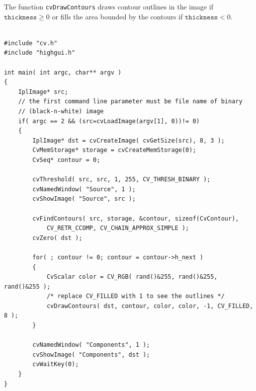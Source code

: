 \begin{description}
\end{description}

The function \texttt{cvDrawContours} draws contour outlines in the image if $\texttt{thickness} \ge 0$ or fills the area bounded by the contours if $ \texttt{thickness}<0$.


\begin{lstlisting}

#include "cv.h"
#include "highgui.h"

int main( int argc, char** argv )
{
    IplImage* src;
    // the first command line parameter must be file name of binary 
    // (black-n-white) image
    if( argc == 2 && (src=cvLoadImage(argv[1], 0))!= 0)
    {
        IplImage* dst = cvCreateImage( cvGetSize(src), 8, 3 );
        CvMemStorage* storage = cvCreateMemStorage(0);
        CvSeq* contour = 0;

        cvThreshold( src, src, 1, 255, CV_THRESH_BINARY );
        cvNamedWindow( "Source", 1 );
        cvShowImage( "Source", src );

        cvFindContours( src, storage, &contour, sizeof(CvContour), 
			CV_RETR_CCOMP, CV_CHAIN_APPROX_SIMPLE );
        cvZero( dst );

        for( ; contour != 0; contour = contour->h_next )
        {
            CvScalar color = CV_RGB( rand()&255, rand()&255, rand()&255 );
            /* replace CV_FILLED with 1 to see the outlines */
            cvDrawContours( dst, contour, color, color, -1, CV_FILLED, 8 );
        }

        cvNamedWindow( "Components", 1 );
        cvShowImage( "Components", dst );
        cvWaitKey(0);
    }
}

\end{lstlisting}

